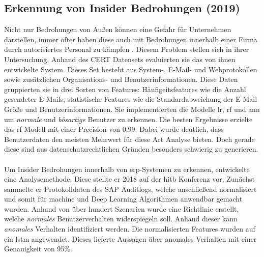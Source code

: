 \documentclass[
    12pt, %
    DIV10,
    ngerman, %
    a4paper, %
    oneside, %
    titlepage, %
    parskip=half, %
    headings=normal, %
    listof=totoc, %
    bibliography=totoc, %
    index=totoc, %
    captions=tableheading, %
    final %
]{scrreprt}
\begin{document}
\subsection{Erkennung von Insider Bedrohungen (2019)}\label{cert}
Nicht nur Bedrohungen von Au{\ss}en können eine Gefahr für Unternehmen darstellen, immer öfter haben diese auch mit Bedrohungen innerhalb einer Firma durch autorisiertes Personal zu kämpfen \parencite{Partners}. Diesem Problem stellen sich \textcite{Le2019} in ihrer Untersuchung. Anhand des CERT Datensets \parencite{glasser2013bridging} evaluierten sie das von ihnen entwickelte System. Dieses Set besteht aus System-, E-Mail- und Webprotokollen sowie zusätzlichen Organisations- und Benutzerinformationen. Diese Daten gruppierten sie in drei Sorten von Features: Häufigeitsfeatures wie die Anzahl gesendeter E-Mails, statistische Features wie die Standardabweichung der E-Mail Grö{\ss}e und Benutzerinformationen. Sie implementierten die Modelle \ac{lr}, \ac{rf} und \ac{ann} um \emph{normale} und \emph{bösartige} Benutzer zu erkennen. Die besten Ergebnisse erzielte das \ac{rf} Modell mit einer Precision von 0.99. Dabei wurde deutlich, dass Benutzerdaten den meisten Mehrwert für diese Art Analyse bieten. Doch gerade diese sind aus datenschutzrechtlichen Gründen besonders schwierig zu generieren. 
\\\\
Um Insider Bedrohungen innerhalb von \ac{erp}-Systemen zu erkennen, entwickelte \textcite{Neyolov} eine Analysemethode. Diese stellte er 2018 auf der \ac{hitb} Konferenz vor. Zunächst sammelte er Protokolldaten des SAP Auditlogs, welche anschlie{\ss}end normalisiert und somit für machine und Deep Learning Algorithmen anwendbar gemacht wurden. Anhand von über hundert Szenarien wurde eine Richtlinie erstellt, welche \emph{normales} Benutzerverhalten widerspiegeln soll. Anhand dieser kann \emph{anomales} Verhalten identifiziert werden. Die normalisierten Features wurden auf ein \ac{lstm} angewendet. Dieses lieferte Aussagen über anomales Verhalten mit einer Genauigkeit von 95\%.
\end{document}
